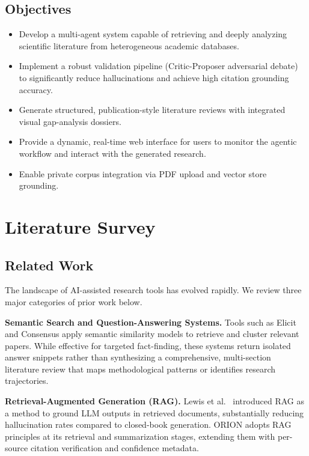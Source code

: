 \documentclass[12pt, a4paper]{article}
\begin{document}
\subsection{Objectives}
\begin{itemize}[leftmargin=*, itemsep=3pt]
    \item Develop a multi-agent system capable of retrieving and deeply analyzing scientific
          literature from heterogeneous academic databases.
    \item Implement a robust validation pipeline (Critic-Proposer adversarial debate) to
          significantly reduce hallucinations and achieve high citation grounding accuracy.
    \item Generate structured, publication-style literature reviews with integrated visual
          gap-analysis dossiers.
    \item Provide a dynamic, real-time web interface for users to monitor the agentic
          workflow and interact with the generated research.
    \item Enable private corpus integration via PDF upload and vector store grounding.
\end{itemize}

\section{Literature Survey}

\subsection{Related Work}

The landscape of AI-assisted research tools has evolved rapidly. We review three major
categories of prior work below.

\textbf{Semantic Search and Question-Answering Systems.}
Tools such as Elicit \cite{elicit2023} and Consensus apply semantic similarity models to
retrieve and cluster relevant papers. While effective for targeted fact-finding, these systems
return isolated answer snippets rather than synthesizing a comprehensive, multi-section
literature review that maps methodological patterns or identifies research trajectories.

\textbf{Retrieval-Augmented Generation (RAG).}
Lewis et al.\ \cite{lewis2020rag} introduced RAG as a method to ground LLM outputs in
retrieved documents, substantially reducing hallucination rates compared to closed-book
generation. ORION adopts RAG principles at its retrieval and summarization stages, extending
them with per-source citation verification and confidence metadata.
\end{document}
